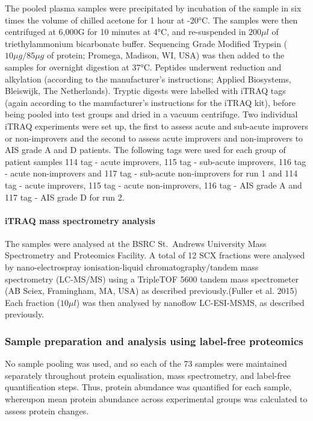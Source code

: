 \documentclass[9pt,lineno]{elife}
\begin{document}
The pooled plasma samples were precipitated by incubation of the sample in six times the volume of chilled acetone for 1 hour at -20°C.
The samples were then centrifuged at 6,000G for 10 minutes at 4°C, and re-suspended in \(200\mu l\) of triethylammonium bicarbonate buffer.
Sequencing Grade Modified Trypsin (\(10\mu g/85\mu g\) of protein; Promega, Madison, WI, USA) was then added to the samples for overnight digestion at 37°C.
Peptides underwent reduction and alkylation (according to the manufacturer's instructions; Applied Biosystems, Bleiswijk, The Netherlands).
Tryptic digests were labelled with iTRAQ tags (again according to the manufacturer's instructions for the iTRAQ kit), before being pooled into test groups and dried in a vacuum centrifuge.
Two individual iTRAQ experiments were set up, the first to assess acute and sub-acute improvers or non-improvers and the second to assess acute improvers and non-improvers to AIS grade A and D patients.
The following tags were used for each group of patient samples 114 tag - acute improvers, 115 tag - sub-acute improvers, 116 tag - acute non-improvers and 117 tag - sub-acute non-improvers for run 1 and 114 tag - acute improvers, 115 tag - acute non-improvers, 116 tag - AIS grade A and 117 tag - AIS grade D for run 2.

\hypertarget{itraq-mass-spectrometry-analysis}{%
\paragraph{iTRAQ mass spectrometry analysis}\label{itraq-mass-spectrometry-analysis}}

The samples were analysed at the BSRC St.~Andrews University Mass Spectrometry and Proteomics Facility.
A total of 12 SCX fractions were analysed by nano-electrospray ionisation-liquid chromatography/tandem mass spectrometry (LC-MS/MS) using a TripleTOF 5600 tandem mass spectrometer (AB Sciex, Framingham, MA, USA) as described previously.(Fuller et al. 2015) Each fraction (\(10 \mu l\)) was then analysed by nanoflow LC-ESI-MSMS, as described previously.

\hypertarget{label-free-sample-prep}{%
\subsubsection{Sample preparation and analysis using label-free proteomics}\label{label-free-sample-prep}}

No sample pooling was used, and so each of the 73 samples were maintained separately throughout protein equalisation, mass spectrometry, and label-free quantification steps.
Thus, protein abundance was quantified for each sample, whereupon mean protein abundance across experimental groups was calculated to assess protein changes.
\end{document}
